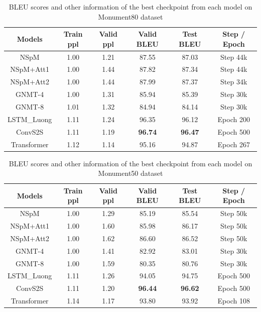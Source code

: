 \begin{table}[h]
\centering
\caption{BLEU scores and other information of the best checkpoint from each model on Monument80 dataset}
\label{table:monu80 bleu}
\begin{tabular}{c|c|c|c|c|c}
Models & Train ppl & Valid ppl & \textbf{Valid BLEU} & \textbf{Test BLEU} & Step / Epoch \\
\hline
NSpM & 1.00 & 1.21 & 87.55 & 87.03 & Step 44k \\
NSpM+Att1 & 1.00 & 1.44 & 87.82 & 87.34 & Step 44k \\
NSpM+Att2 & 1.00 & 1.44 & 87.99 & 87.37 & Step 34k \\
GNMT-4 & 1.00 & 1.31 & 85.94 & 85.39 & Step 30k \\
GNMT-8 & 1.01 & 1.32 & 84.94 & 84.14 & Step 30k \\
LSTM\_Luong & 1.11 & 1.24 & 96.35 & 96.12 & Epoch 200 \\
ConvS2S & 1.11 & 1.19 & \textbf{96.74} & \textbf{96.47} & Epoch 500 \\
Transformer & 1.12 & 1.14 & 95.16 & 94.87 & Epoch 267 \\
\end{tabular}
\end{table}

\begin{table}[h]
\centering
\caption{BLEU scores and other information of the best checkpoint from each model on Monument50 dataset}
\label{table:monu50 bleu}
\begin{tabular}{c|c|c|c|c|c}
Models & Train ppl & Valid ppl & \textbf{Valid BLEU} & \textbf{Test BLEU} & Step / Epoch \\
\hline
NSpM & 1.00 & 1.29 & 85.19 & 85.54 & Step 50k \\
NSpM+Att1 & 1.00 & 1.60 & 85.98 & 86.17 & Step 50k \\
NSpM+Att2 & 1.00 & 1.62 & 86.60 & 86.52 & Step 50k \\
GNMT-4 & 1.00 & 1.41 & 82.92 & 83.01 & Step 30k \\
GNMT-8 & 1.00 & 1.59 & 80.35 & 80.76 & Step 30k \\
LSTM\_Luong & 1.11 & 1.26 & 94.05 & 94.75 & Epoch 500 \\
ConvS2S & 1.11 & 1.20 & \textbf{96.44} & \textbf{96.62} & Epoch 500 \\
Transformer & 1.14 & 1.17 & 93.80 & 93.92 & Epoch 108 \\
\end{tabular}
\end{table}

